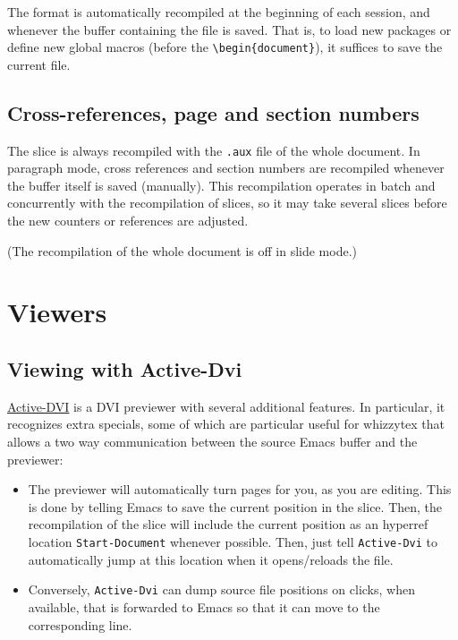 \documentclass[12pt]{article}
\let \lst \verb
\begin{document}
The format is automatically recompiled at the beginning of each session, and
whenever the buffer containing the file is saved. That is, to load new
packages or define new global macros (before the \lst"\begin{document}"), it
suffices to save the current file.

\subsection {Cross-references, page and section numbers} 

The slice is always recompiled with the \lst".aux" file of the whole
document.  In paragraph mode, cross references and section numbers are 
recompiled whenever the buffer itself is saved (manually). 
This recompilation operates in batch and concurrently with the recompilation
of slices, so it may take several slices before the new counters or
references are adjusted.

(The recompilation of the whole document is off in slide mode.) 


\section {Viewers}

\subsection {Viewing with Active-Dvi}

\href{http://pauillac.inria.fr/advi/}{Active-DVI} is a DVI previewer with
several additional features. 
In particular, it recognizes extra specials, some of which are particular 
useful for whizzytex that allows a two way communication between 
the source Emacs buffer and the previewer: 
\begin {itemize}
\item
The previewer will automatically turn pages for you, as you are editing. 
This is done by telling Emacs to save the current position in the slice. 
Then, the recompilation of the slice will include the current position 
as an hyperref location \lst"Start-Document" whenever possible. 
Then, just tell \lst"Active-Dvi" to automatically jump at this location
when it opens/reloads the file. 

\item
Conversely, \lst"Active-Dvi" can dump source file positions on clicks, 
when available, that is forwarded to Emacs so that it can move to the
corresponding line.


\end{itemize}
\end{document}
\end{document}
